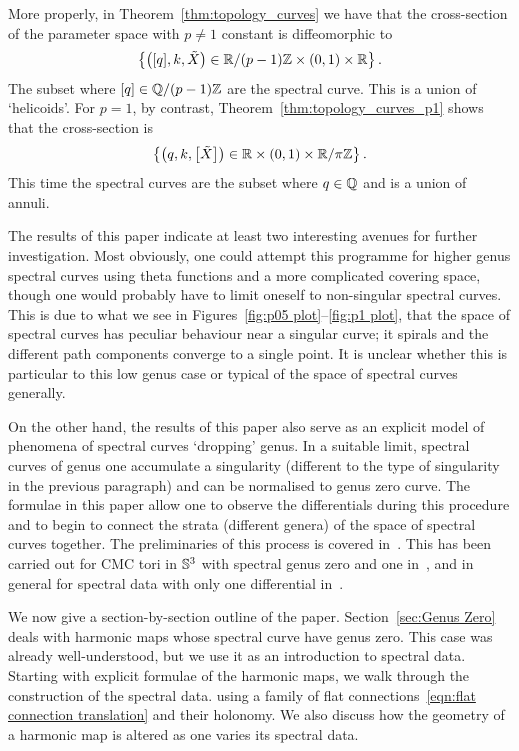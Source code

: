 \documentclass{article}
\begin{document}
More properly, in Theorem~\ref{thm:topology_curves} we have that the cross-section of the parameter space with $p\neq 1$ constant is diffeomorphic to 
\[
\left\{ \bra{[q],k,\tilde{X}} \in \R/(p-1)\Z \times (0,1) \times \R \right\}.
\]
The subset where $[q] \in \Q/(p-1)\Z$ are the spectral curve. This is a union of `helicoids'.
For $p=1$, by contrast, Theorem~\ref{thm:topology_curves_p1} shows that the cross-section is 
\[
\left\{ \bra{q,k,\left[\tilde{X}\right]} \in \R \times (0,1) \times \R/\pi\Z \right\}.
\]
This time the spectral curves are the subset where $q\in\Q$ and is a union of annuli.

















The results of this paper indicate at least two interesting avenues for further investigation. Most obviously, one could attempt this programme for higher genus spectral curves using theta functions and a more complicated covering space, though one would probably have to limit oneself to non-singular spectral curves. This is due to what we see in Figures~\ref{fig:p05 plot}--\ref{fig:p1 plot}, that the space of spectral curves has peculiar behaviour near a singular curve; it spirals and the different path components converge to a single point. It is unclear whether this is particular to this low genus case or typical of the space of spectral curves generally.

On the other hand, the results of this paper also serve as an explicit model of phenomena of spectral curves `dropping' genus. In a suitable limit, spectral curves of genus one accumulate a singularity (different to the type of singularity in the previous paragraph) and can be normalised to genus zero curve. The formulae in this paper allow one to observe the differentials during this procedure and to begin to connect the strata (different genera) of the space of spectral curves together. The preliminaries of this process is covered in~\cite[Section~4.2]{Ogilvie2017}. This has been carried out for CMC tori in $\S^3$ with spectral genus zero and one in~\cite{Kilian2015a}, and in general for spectral data with only one differential in~\cite{Hauswirth2017}.

We now give a section-by-section outline of the paper. Section~\ref{sec:Genus Zero} deals with harmonic maps whose spectral curve have genus zero. This case was already well-understood, but we use it as an introduction to spectral data. Starting with explicit formulae of the harmonic maps, we walk through the construction of the spectral data.  using a family of flat connections~\eqref{eqn:flat connection translation} and their holonomy.
We also discuss how the geometry of a harmonic map is altered as one varies its spectral data.
\end{document}
